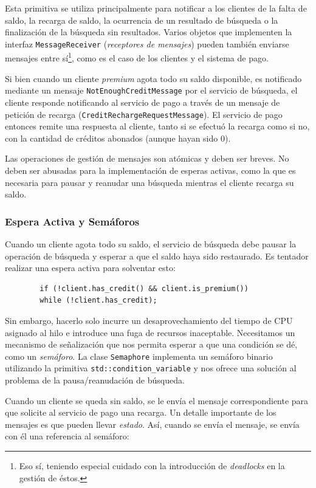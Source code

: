 \documentclass[a4paper]{article}
\begin{document}
	Esta primitiva se utiliza principalmente para notificar a los clientes de la falta de saldo, la recarga de saldo, la ocurrencia de un resultado de búsqueda o la finalización de la búsqueda sin resultados. Varios objetos que implementen la interfaz \texttt{MessageReceiver} (\textit{receptores de mensajes}) pueden también enviarse mensajes entre sí\footnote{Eso sí, teniendo especial cuidado con la introducción de \textit{deadlocks} en la gestión de éstos.}, como es el caso de los clientes y el sistema de pago.
	
	Si bien cuando un cliente \textit{premium} agota todo su saldo disponible, es notificado mediante un mensaje \texttt{NotEnoughCreditMessage} por el servicio de búsqueda, el cliente responde notificando al servicio de pago a través de un mensaje de petición de recarga (\texttt{CreditRechargeRequestMessage}). El servicio de pago entonces remite una respuesta al cliente, tanto si se efectuó la recarga como si no, con la cantidad de créditos abonados (aunque hayan sido $0$).
	
	Las operaciones de gestión de mensajes son atómicas y deben ser breves. No deben ser abusadas para la implementación de esperas activas, como la que es necesaria para pausar y reanudar una búsqueda mientras el cliente recarga su saldo.
	
	\subsubsection*{Espera Activa y Semáforos}
	Cuando un cliente agota todo su saldo, el servicio de búsqueda debe pausar la operación de búsqueda y esperar a que el saldo haya sido restaurado. Es tentador realizar una espera activa para solventar esto:
	
	\begin{verbatim}
		if (!client.has_credit() && client.is_premium())
		while (!client.has_credit);
	\end{verbatim}
	
	Sin embargo, hacerlo solo incurre un desaprovechamiento del tiempo de CPU asignado al hilo e introduce una fuga de recursos inaceptable. Necesitamos un mecanismo de señalización que nos permita esperar a que una condición se dé, como un \textit{semáforo}. La clase \texttt{Semaphore} implementa un semáforo binario utilizando la primitiva \texttt{std::condition\_variable} y nos ofrece una solución al problema de la pausa/reanudación de búsqueda.
	
	\pagebreak
	
	Cuando un cliente se queda sin saldo, se le envía el mensaje correspondiente para que solicite al servicio de pago una recarga. Un detalle importante de los mensajes es que pueden llevar \textit{estado}. Así, cuando se envía el mensaje, se envía con él una referencia al semáforo:
	
\end{document}
